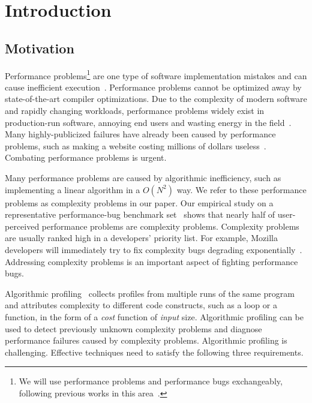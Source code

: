 \section{Introduction}
\label{sec:intro}

\subsection{Motivation}
\label{sec:motiv}

Performance problems\footnote{We will use performance problems and performance bugs exchangeably, 
following previous works in this area~\cite{SongOOPSLA2014,ldoctor}.} 
are one type of software implementation mistakes
and can cause inefficient execution~\cite{PerfBug,perf.fse10,SongOOPSLA2014,ldoctor,Alabama}. 
Performance problems cannot be optimized away by state-of-the-art compiler optimizations.
Due to the complexity of modern software and rapidly changing workloads, 
performance problems widely exist in production-run software, 
annoying end users and wasting energy in the field~\cite{PerfBug,SongOOPSLA2014,ldoctor}. 
Many highly-publicized failures have already been caused by performance problems, 
such as making a website costing millions of dollars useless~\cite{ACA-health}.
Combating performance problems is urgent. 

Many performance problems are caused by algorithmic inefficiency, 
such as implementing a linear algorithm in a $O(N^2)$ way.
We refer to these performance problems as complexity problems in our paper.
Our empirical study on a representative performance-bug 
benchmark set~\cite{PerfBug,SongOOPSLA2014} shows that 
nearly half of user-perceived performance problems are complexity problems. 
Complexity problems are usually ranked high in a developers' priority list. 
For example, Mozilla developers will immediately try to fix complexity bugs degrading exponentially~\cite{mozilla35294}. 
Addressing complexity problems is an important aspect of fighting performance bugs. 


Algorithmic profiling~\cite{Aprof1,Aprof2,AlgoProf} collects profiles from multiple 
runs of the same program and attributes complexity to different code constructs, such as a loop or a function,
in the form of a \textit{cost} function of \textit{input} size. 
Algorithmic profiling can be used to detect previously unknown complexity problems and 
diagnose performance failures caused by complexity problems. 
Algorithmic profiling is challenging. 
Effective techniques need to satisfy the following three requirements.

